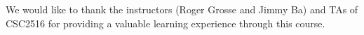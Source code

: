 \documentclass{article}
\begin{document}
We would like to thank the instructors (Roger Grosse and Jimmy Ba) and TAs of CSC2516 for providing a valuable learning experience through this course.



%
%
%
%
%
\end{document}
